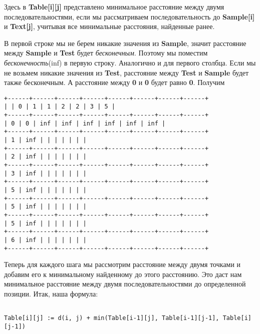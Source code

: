 \vspace{\baselineskip}
Здесь в \textbf{Table[i][j]} представлено минимальное расстояние между двумя последовательностями, если мы рассматриваем последовательность до \textbf{Sample[i]} и \textbf{Text[j]}, учитывая все минимальные расстояния, найденные ранее.

\vspace{\baselineskip}
В первой строке мы не берем никакие значения из \textbf{Sample}, значит расстояние между \textbf{Sample} и \textbf{Test} будет \textit{бесконечным}. Поэтому мы поместим \textit{бесконечность}(inf) в первую строку. Аналогично и для первого столбца. Если мы не возьмем никакие значения из \textbf{Test}, расстояние между \textbf{Test} и \textbf{Sample} будет также бесконечным. А расстояние между \textbf{0} и \textbf{0} будет равно \textbf{0}. Получим

\begin{tcolorbox}
\begin{verbatim}
+------+------+------+------+------+------+------+------+
| | 0 | 1 | 1 | 2 | 2 | 3 | 5 |
+------+------+------+------+------+------+------+------+
| 0 | 0 | inf | inf | inf | inf | inf | inf |
+------+------+------+------+------+------+------+------+
| 1 | inf | | | | | | |
+------+------+------+------+------+------+------+------+
| 2 | inf | | | | | | |
+------+------+------+------+------+------+------+------+
| 3 | inf | | | | | | |
+------+------+------+------+------+------+------+------+
| 5 | inf | | | | | | |
+------+------+------+------+------+------+------+------+
| 5 | inf | | | | | | |
+------+------+------+------+------+------+------+------+
| 5 | inf | | | | | | |
+------+------+------+------+------+------+------+------+
| 6 | inf | | | | | | |
+------+------+------+------+------+------+------+------+
\end{verbatim}
\end{tcolorbox}

\vspace{\baselineskip}
\vspace{-0.2cm}
Теперь для каждого шага мы рассмотрим расстояние между двумя точками и добавим его к минимальному найденному до этого расстоянию. Это даст нам минимальное расстояние между двумя последовательностями до определенной позиции. Итак, наша формула:

\vspace{\baselineskip}
\begin{tcolorbox}
\begin{verbatim}

Table[i][j] := d(i, j) + min(Table[i-1][j], Table[i-1][j-1], Table[i][j-1])

\end{verbatim}
\end{tcolorbox}


